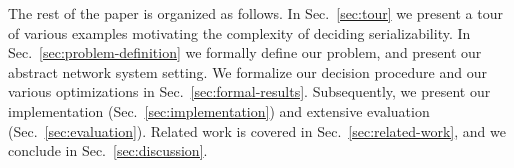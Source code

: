 The rest of the paper is organized as follows. In Sec.~\ref{sec:tour} we present a tour of various examples motivating the complexity of deciding serializability. In Sec.~\ref{sec:problem-definition} we formally define our problem, and present our abstract  network system setting. We formalize our decision procedure and our various optimizations in Sec.~\ref{sec:formal-results}. Subsequently, we present our implementation (Sec.~\ref{sec:implementation}) and extensive evaluation (Sec.~\ref{sec:evaluation}). 
Related work is covered in Sec.~\ref{sec:related-work}, and we conclude in Sec.~\ref{sec:discussion}.






